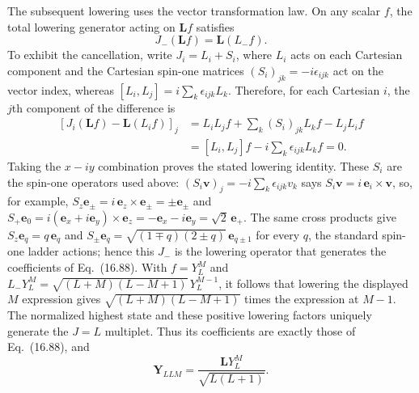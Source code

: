 The subsequent lowering uses the vector transformation law.
On any scalar $f$, the total lowering generator acting on
$\mathbf Lf$ satisfies
\[
J_-(\mathbf Lf)=\mathbf L(L_-f).
\]
To exhibit the cancellation, write $J_i=L_i+S_i$, where $L_i$ acts
on each Cartesian component and the Cartesian spin-one matrices
$(S_i)_{jk}=-i\epsilon_{ijk}$ act on the vector index, whereas
$[L_i,L_j]=i\sum_k\epsilon_{ijk}L_k$. Therefore, for each Cartesian
$i$, the $j$th component of the difference is
\[
\begin{aligned}
[J_i(\mathbf Lf)-\mathbf L(L_if)]_j
&=L_iL_jf+\sum_k(S_i)_{jk}L_kf-L_jL_if\\
&=[L_i,L_j]f-i\sum_k\epsilon_{ijk}L_kf=0.
\end{aligned}
\]
Taking the $x-i y$ combination proves the stated lowering identity.
These $S_i$ are the spin-one operators used above:
$(S_i\mathbf v)_j=-i\sum_k\epsilon_{ijk}v_k$ says
$S_i\mathbf v=i\,\mathbf e_i\times\mathbf v$, so, for example,
$S_z\mathbf e_\pm=i\,\mathbf e_z\times\mathbf e_\pm=\pm\mathbf e_\pm$
and $S_+\mathbf e_0=i(\mathbf e_x+i\mathbf e_y)\times\mathbf e_z
=-\mathbf e_x-i\mathbf e_y=\sqrt2\,\mathbf e_+$. The same cross
products give $S_z\mathbf e_q=q\,\mathbf e_q$ and
$S_\pm\mathbf e_q=\sqrt{(1\mp q)(2\pm q)}\,\mathbf e_{q\pm1}$ for
every $q$, the standard spin-one ladder actions; hence this $J_-$ is
the lowering operator that generates the coefficients of
Eq.~(16.88).
With $f=Y_L^M$ and
$L_-Y_L^M=\sqrt{(L+M)(L-M+1)}\,Y_L^{M-1}$, it follows that lowering
the displayed $M$ expression gives
$\sqrt{(L+M)(L-M+1)}$ times the expression at $M-1$.
The normalized highest state and these positive lowering factors
uniquely generate the $J=L$ multiplet. Thus its coefficients are
exactly those of Eq.~(16.88), and
\[
\boxed{\mathbf Y_{LLM}=\frac{\mathbf LY_L^M}{\sqrt{L(L+1)}}}.
\]

